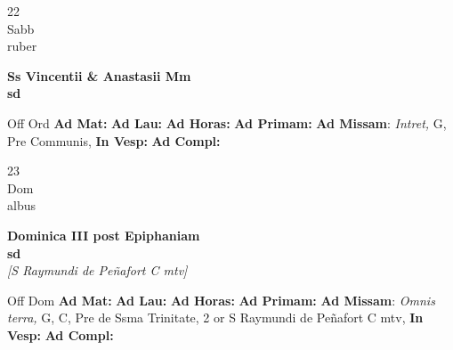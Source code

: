 \documentclass[10pt, openany]{book}
\begin{document}
    \begin{center}
        \begin{minipage}{3.5in}
            \vspace{2em}
            \begin{minipage}{0.5in}
                {\Huge 22} \\
                {\normalsize Sabb} \\
                {\normalsize ruber}
            \end{minipage}
            \begin{minipage}{3.0in}
                \textbf{ \large Ss Vincentii \& Anastasii Mm \\
                \textnormal{\normalsize sd}} \\ 
            \end{minipage}
            \begin{justify}Off Ord
                \textbf{Ad Mat: }
                \textbf{Ad Lau: }
                \textbf{Ad Horas: }
                \textbf{Ad Primam: }\textbf{Ad Missam}: \textit{Intret,} G, Pre Communis,  
                \textbf{In Vesp: }
                \textbf{Ad Compl: }
            \end{justify}
        \end{minipage}
    \end{center}

    \begin{center}
        \begin{minipage}{3.5in}
            \vspace{2em}
            \begin{minipage}{0.5in}
                {\Huge 23} \\
                {\normalsize Dom} \\
                {\normalsize albus}
            \end{minipage}
            \begin{minipage}{3.0in}
                \textbf{ \large Dominica III post Epiphaniam \\
                \textnormal{\normalsize sd}} \\ \textit{[S Raymundi de Peñafort C mtv]} \\ 
            \end{minipage}
            \begin{justify}Off Dom
                \textbf{Ad Mat: }
                \textbf{Ad Lau: }
                \textbf{Ad Horas: }
                \textbf{Ad Primam: }\textbf{Ad Missam}: \textit{Omnis terra,} G, C, Pre de Ssma Trinitate, 2 or S Raymundi de Peñafort C mtv,  
                \textbf{In Vesp: }
                \textbf{Ad Compl: }
            \end{justify}
        \end{minipage}
    \end{center}
\end{document}
